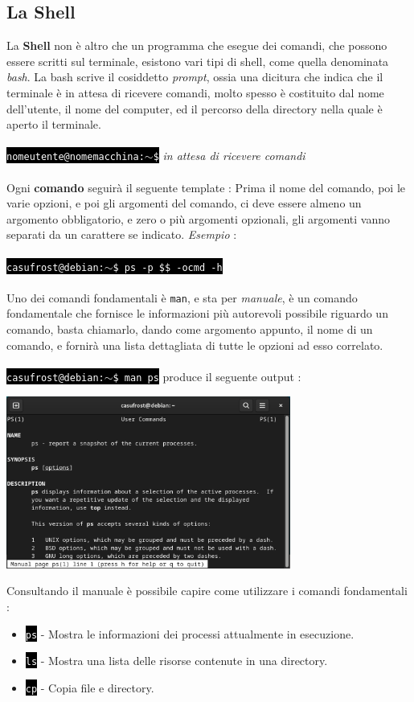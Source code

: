 \documentclass[12pt, letterpaper]{article}
\makeatletter
\newcommand{\code}[1]{\colorbox{light-gray}{\texttt{#1}}}
\newcommand{\shelll}[1]{\colorbox{black}{\textcolor{white}{\texttt{#1}}}}
\newcommand{\shell}[1]{\colorbox{black}{\textcolor{white}{\texttt{casufrost@debian:$\sim$\$ #1}}}}
\newcommand{\acc}{\\\hphantom{}\\}
\makeatother
\begin{document}
\subsection{La Shell}
La \textbf{Shell} non è altro che un programma che esegue dei comandi, che possono essere scritti sul 
terminale, esistono vari tipi di shell, come quella denominata \textit{bash}. La bash scrive il cosiddetto 
\textit{prompt}, ossia una dicitura che indica che il terminale è in attesa di ricevere comandi, molto spesso è 
costituito dal nome dell'utente, il nome del computer, ed il percorso della directory nella quale è aperto il 
terminale.\acc
\shelll{nomeutente@nomemacchina:$\sim$\$} \textit{in attesa di ricevere comandi}
\acc 
Ogni \textbf{comando} seguirà il seguente template : Prima il nome del comando, poi le varie opzioni, e poi gli argomenti 
del comando, ci deve essere almeno un argomento obbligatorio, e zero o più argomenti opzionali, gli argomenti vanno 
separati da un carattere se indicato. \textit{Esempio} :\acc 
\shell{ps -p \$\$ -ocmd -h}
\acc 
Uno dei comandi fondamentali è \code{man}, e sta per \textit{manuale}, è un comando fondamentale che fornisce 
le informazioni più autorevoli possibile riguardo un comando, basta chiamarlo, dando come argomento appunto, il 
nome di un comando, e fornirà una lista dettagliata di tutte le opzioni ad esso correlato.\acc 
\shell{man ps} produce il seguente output : \begin{center}
    \includegraphics[width=0.7\textwidth ]{images/manPs.png}
\end{center}
Consultando il manuale è possibile capire come utilizzare i comandi fondamentali : 
\begin{itemize}
    \item \shelll{ps} - Mostra le informazioni dei processi attualmente in esecuzione.
    \item \shelll{ls} - Mostra una lista delle risorse contenute in una directory.
    \item \shelll{cp} - Copia file e directory.
\end{itemize}
\end{document}

